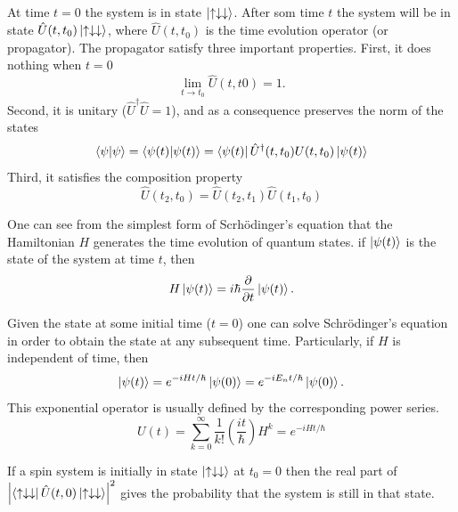 \documentclass{article}
\begin{document}
\subsection{}
At time $t=0$ the system is in state $\ket{\uparrow\downarrow\downarrow}$. After som time $t$ the system will be in state $\hat{U}(t,t_0)\ket{\uparrow\downarrow\downarrow}$, where $\hat{U}(t,t_0)$ is the time evolution operator (or propagator). The propagator satisfy three important properties. First, it does nothing when $t=0$
\begin{equation}
\lim_{t\to t_0}\hat{U}(t,t0)=1.
\end{equation}
Second, it is unitary ($\hat{U}^{\dagger}\hat{U}=1$), and as a consequence preserves the norm of the states
\begin{equation}
\braket{\psi} = \braket{\psi(t)} = \bra{\psi(t)} \hat{U}^{\dagger}(t,t_0){U}(t,t_0) \ket{\psi(t)}
\end{equation}
Third, it satisfies the composition property
\begin{equation}
\hat{U}(t_2,t_0)=\hat{U}(t_2,t_1)\hat{U}(t_1,t_0)
\end{equation}

One can see from the simplest form of Scrhödinger's equation that the Hamiltonian $H$ generates the time evolution of quantum states. if $\ket{\psi(t)}$ is the state of the system at time $t$, then
\begin{equation}
H\ket{\psi(t)}=i\hbar\frac{\partial}{\partial t}\ket{\psi(t)}.
\end{equation}

Given the state at some initial time ($t=0$) one can solve Schrödinger's equation in order to obtain the state at any subsequent time. Particularly, if $H$ is independent of time, then
\begin{equation}
\ket{\psi(t)}=e^{-iHt/\hbar}\ket{\psi(0)} = e^{-iE_nt/\hbar}\ket{\psi(0)}.
\end{equation}
This exponential operator is usually defined by the corresponding power series. 
\begin{equation}
U(t) = \sum_{k=0}^{\infty}\frac{1}{k!}\left(\frac{it}{\hbar} \right)H^k = e^{-iHt/\hbar}
\end{equation}

If a spin system is initially in state $\ket{\uparrow\downarrow\downarrow}$ at $t_0=0$ then the real part of $\abs{\bra{\uparrow\downarrow\downarrow}\hat{U}(t,0) \ket{\uparrow\downarrow\downarrow}}^2$ gives the probability that the system is still in that state.
\end{document}
